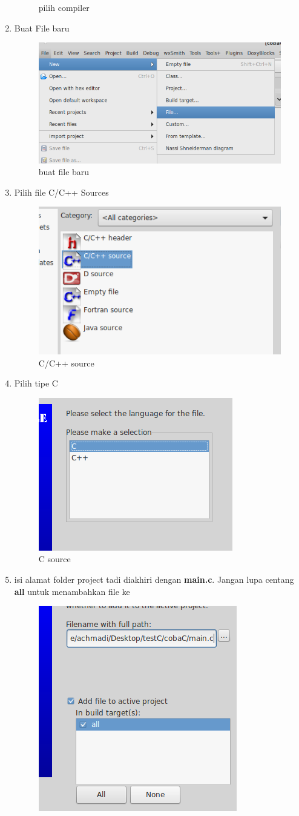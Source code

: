 \documentclass[12pt,]{article}
\begin{document}
\begin{enumerate}
\begin{figure}[H]
			\caption{pilih compiler}
		\end{figure}
		\item Buat File baru
		\begin{figure}[H]
			\centering
			\includegraphics[width=0.4\linewidth]{images/c_cb_4}
			\caption{buat file baru}
		\end{figure}
		\item Pilih file C/C++ Sources
		\begin{figure}[H]
			\centering
			\includegraphics[width=0.4\linewidth]{images/c_cb_5}
			\caption{C/C++ source}
		\end{figure}
		\item Pilih tipe C
		\begin{figure}[H]
			\centering
			\includegraphics[width=0.4\linewidth]{images/c_cb_6}
			\caption{C source}
		\end{figure}
		\item isi alamat folder project tadi diakhiri dengan \textbf{main.c}.
		Jangan lupa centang \textbf{all} untuk menambahkan file ke 
		\begin{figure}[H]
			\centering
			\includegraphics[width=0.4\linewidth]{images/c_cb_7}

\end{figure}
\end{enumerate}
\end{document}
